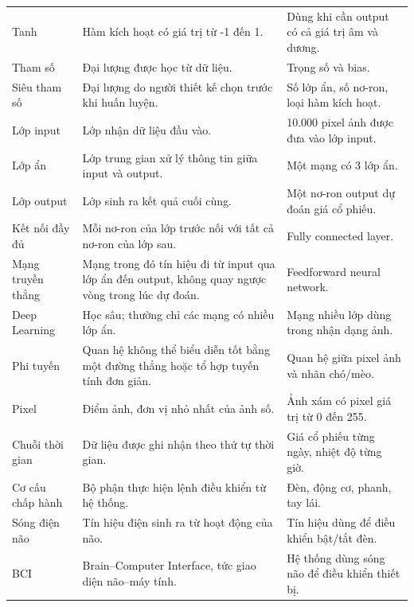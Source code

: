 \documentclass[12pt,a4paper]{report}
\begin{document}
\begin{longtable}{p{}p{}p{}}
Tanh & Hàm kích hoạt có giá trị từ -1 đến 1. & Dùng khi cần output có cả giá trị âm và dương. \\

Tham số & Đại lượng được học từ dữ liệu. & Trọng số và bias. \\

Siêu tham số & Đại lượng do người thiết kế chọn trước khi huấn luyện. & Số lớp ẩn, số nơ-ron, loại hàm kích hoạt. \\

Lớp input & Lớp nhận dữ liệu đầu vào. & 10.000 pixel ảnh được đưa vào lớp input. \\

Lớp ẩn & Lớp trung gian xử lý thông tin giữa input và output. & Một mạng có 3 lớp ẩn. \\

Lớp output & Lớp sinh ra kết quả cuối cùng. & Một nơ-ron output dự đoán giá cổ phiếu. \\

Kết nối đầy đủ & Mỗi nơ-ron của lớp trước nối với tất cả nơ-ron của lớp sau. & Fully connected layer. \\

Mạng truyền thẳng & Mạng trong đó tín hiệu đi từ input qua lớp ẩn đến output, không quay ngược vòng trong lúc dự đoán. & Feedforward neural network. \\

Deep Learning & Học sâu; thường chỉ các mạng có nhiều lớp ẩn. & Mạng nhiều lớp dùng trong nhận dạng ảnh. \\

Phi tuyến & Quan hệ không thể biểu diễn tốt bằng một đường thẳng hoặc tổ hợp tuyến tính đơn giản. & Quan hệ giữa pixel ảnh và nhãn chó/mèo. \\

Pixel & Điểm ảnh, đơn vị nhỏ nhất của ảnh số. & Ảnh xám có pixel giá trị từ 0 đến 255. \\

Chuỗi thời gian & Dữ liệu được ghi nhận theo thứ tự thời gian. & Giá cổ phiếu từng ngày, nhiệt độ từng giờ. \\

Cơ cấu chấp hành & Bộ phận thực hiện lệnh điều khiển từ hệ thống. & Đèn, động cơ, phanh, tay lái. \\

Sóng điện não & Tín hiệu điện sinh ra từ hoạt động của não. & Tín hiệu dùng để điều khiển bật/tắt đèn. \\

BCI & Brain--Computer Interface, tức giao diện não--máy tính. & Hệ thống dùng sóng não để điều khiển thiết bị. \\

\bottomrule
\end{longtable}
\normalsize
\end{document}
